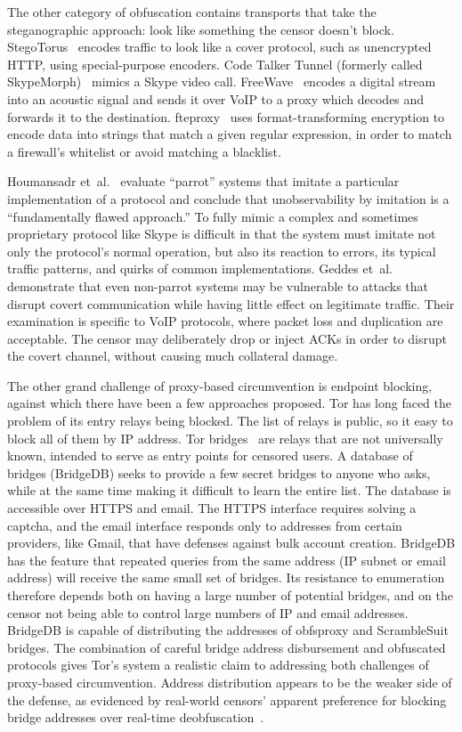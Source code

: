 \documentclass{article}
\begin{document}
The other category of obfuscation contains transports that take the steganographic approach: look like
something the censor doesn't block. StegoTorus~\cite{stegotorus}
encodes traffic to look like a cover protocol, such as unencrypted HTTP,
using special-purpose encoders.
Code Talker
Tunnel (formerly called SkypeMorph)~\cite{skypemorph} mimics a Skype video call.
FreeWave~\cite{freewave} encodes a digital stream into an acoustic signal
and sends it over VoIP to a proxy which decodes and forwards it to the destination.
fteproxy~\cite{fte} uses format-transforming encryption to encode data into strings that match a given regular expression,
in order to match a firewall's whitelist or avoid matching a blacklist.

Houmansadr et~al.~\cite{parrot} evaluate ``parrot'' systems that imitate a particular implementation of a protocol
and conclude that unobservability by imitation is a ``fundamentally
flawed approach.''
To fully mimic a complex and sometimes proprietary protocol like Skype
is difficult in that the system must imitate not only the protocol's normal operation, but also its reaction to errors,
its typical traffic patterns, and quirks of common implementations.
Geddes et~al.~\cite{acks}
demonstrate that even non-parrot systems may be vulnerable to
attacks that disrupt covert communication while having little effect
on legitimate traffic. Their examination is specific to VoIP protocols,
where packet loss and duplication are acceptable. The censor may
deliberately drop or inject ACKs in order to disrupt the covert channel, without causing
much collateral damage.


The other grand challenge of proxy-based circumvention is endpoint blocking,
against which there have been a few approaches proposed.
Tor has long faced the problem of its entry relays being blocked. The list of
relays is public, so it easy to block all of them by IP address. Tor
bridges~\cite{tor-blocking} are relays that are not universally known, intended
to serve as entry points for censored users. A database of bridges (BridgeDB) seeks to
provide a few secret bridges to anyone who asks, while at the same time making it
difficult to learn the entire list.
The database is accessible over HTTPS and email.
The HTTPS interface requires solving a captcha,
and the email interface responds only to addresses from certain providers, like Gmail,
that have defenses against bulk account creation.
BridgeDB has the feature that repeated queries from the same address
(IP subnet or email address) will receive the same small set of bridges.
Its resistance to enumeration therefore depends both on
having a large number of potential bridges,
and on the censor not being able to control large numbers of IP and email addresses.
BridgeDB is capable of distributing
the addresses of obfsproxy and ScrambleSuit bridges.
The combination
of careful bridge address disbursement and obfuscated protocols
gives Tor's system a realistic claim to addressing both challenges of proxy-based circumvention.
Address distribution appears to be the weaker side of the defense,
as evidenced by real-world censors' apparent preference for
blocking bridge addresses over real-time deobfuscation~\cite{foci12-winter}.
\end{document}
